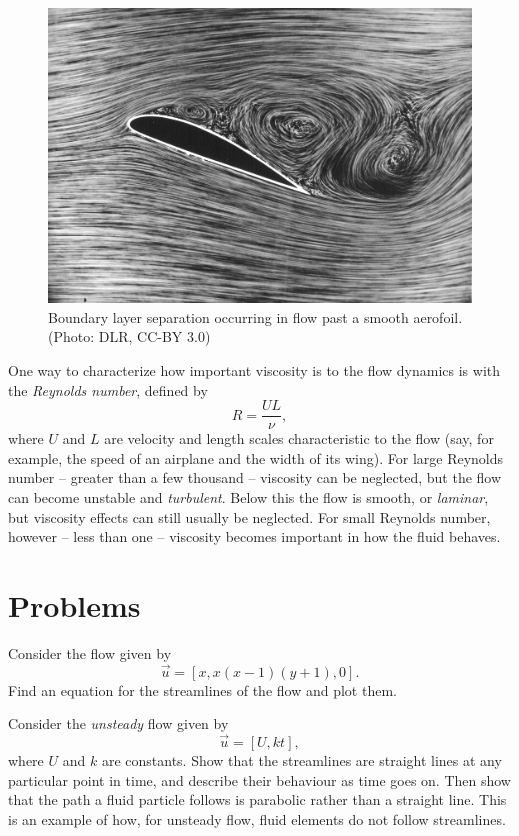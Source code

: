 \begin{figure}[t]
\centering\includegraphics[width=0.7\linewidth]{Figures/Chapter1/fig_boundary_layer_sep.jpg}
\caption{Boundary layer separation occurring in flow past a smooth aerofoil.  (Photo: DLR, CC-BY 3.0)}
\label{fig_boundary_sep}
\end{figure}

One way to characterize how important viscosity is to the flow dynamics is with the \emph{Reynolds number}, defined by
\begin{equation}
R = \frac{UL}{\nu},
\end{equation}
where $U$ and $L$ are velocity and length scales characteristic to the flow (say, for example, the speed of an airplane and the width of its wing).  For large Reynolds number -- greater than a few thousand -- viscosity can be neglected, but the flow can become unstable and \emph{turbulent}.  Below this the flow is smooth, or \emph{laminar}, but viscosity effects can still usually be neglected.  For small Reynolds number, however -- less than one -- viscosity becomes important in how the fluid behaves.



\section*{Problems}
%

\begin{problem}[Streamlines]
Consider the flow given by 
\[
\vec{u} = [x, x(x-1)(y+1), 0].
\]
Find an equation for the streamlines of the flow and plot them.
\end{problem}

\begin{problem}
\label{prob_unsteady}
Consider the \emph{unsteady} flow given by
\[
\vec{u} = [U, kt],
\]
where $U$ and $k$ are constants.  Show that the streamlines are straight lines at any particular point in time, and describe their behaviour as time goes on.  Then show that the path a fluid particle follows is parabolic rather than a straight line.  This is an example of how, for unsteady flow, fluid elements do not follow streamlines.

\end{problem}

